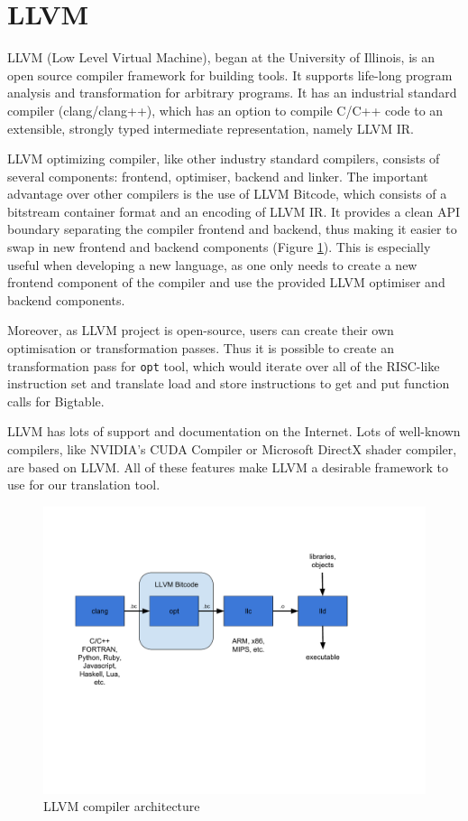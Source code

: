 \documentclass[bsc,frontabs,twoside,singlespacing,parskip,deptreport]{infthesis}     %
\begin{document}
\section{LLVM}

LLVM (Low Level Virtual Machine), began at the University of Illinois, is an open source compiler framework for building tools. It supports life-long program analysis and transformation for arbitrary programs. It has an industrial standard compiler (clang/clang++), which has an option to compile C/C++ code to an extensible, strongly typed intermediate representation, namely LLVM IR.

LLVM optimizing compiler, like other industry standard compilers, consists of several components: frontend, optimiser, backend and linker. The important advantage over other compilers is the use of LLVM Bitcode, which consists of a bitstream container format and an encoding of LLVM IR. It provides a clean API boundary separating the compiler frontend and backend, thus making it easier to swap in new frontend and backend components (Figure \ref{fig:llvm}). This is especially useful when developing a new language, as one only needs to create a new frontend component of the compiler and use the provided LLVM optimiser and backend components. 

Moreover, as LLVM project is open-source, users can create their own optimisation or transformation passes. Thus it is possible to create an transformation pass for \texttt{opt} tool, which would iterate over all of the RISC-like instruction set and translate load and store instructions to get and put function calls for Bigtable.

LLVM has lots of support and documentation on the Internet. Lots of well-known compilers, like NVIDIA's CUDA Compiler or Microsoft DirectX shader compiler, are based on LLVM. All of these features make LLVM a desirable framework to use for our translation tool.

\begin{figure}[H]
\centering
\includegraphics[width=1\textwidth]{images/llvm}
\caption{LLVM compiler architecture}
\label{fig:llvm}
\end{figure}
\end{document}
